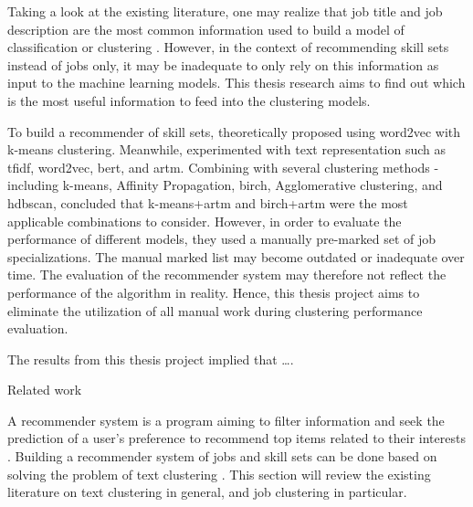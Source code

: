 \documentclass[a4paper,man,floatsintext,natbib,noextraspace]{apa6}
\makeatletter
\renewcommand{\section}{\@startsection {section}{1}
  {\z@}
  {\b@level@one@skip}
  {\e@level@one@skip}
  {\centering\normalfont\bfseries}}
\makeatother
\begin{document}
Taking a look at the existing literature, one may realize that job title and job description are the most common information used to build a model of classification \citep{boselliClassifyingOnlineJob2018} or clustering \citep{djumalievaClassifyingOccupationsAccording2018, mhamdiJobRecommendationBased2020}. However, in the context of recommending skill sets instead of jobs only, it may be inadequate to only rely on this information as input to the machine learning models. This thesis research aims to find out which is the most useful information to feed into the clustering models.

To build a recommender of skill sets, \cite{mhamdiJobRecommendationBased2020} theoretically proposed using word2vec with k-means clustering. Meanwhile, \cite{vinelExperimentalComparisonUnsupervised2019} experimented with text representation such as \gls{tfidf}, word2vec, \gls{bert}, and \gls{artm}. Combining with several clustering methods - including k-means, Affinity Propagation, \gls{birch}, Agglomerative clustering, and \gls{hdbscan}, \cite{vinelExperimentalComparisonUnsupervised2019} concluded that k-means+\gls{artm} and \gls{birch}+\gls{artm} were the most applicable combinations to consider. However, in order to evaluate the performance of different models, they used a manually pre-marked set of job specializations. The manual marked list may become outdated or inadequate over time. The evaluation of the recommender system may therefore not reflect the performance of the algorithm in reality. Hence, this thesis project aims to eliminate the utilization of all manual work during clustering performance evaluation.

The results from this thesis project implied that ….

\section{Related work}

A recommender system is a program aiming to filter information and seek the prediction of a user’s preference to recommend top items related to their interests \citep{luRecommenderSystemApplication2015}. Building a recommender system of jobs and skill sets can be done based on solving the problem of text clustering \citep{luRecommenderSystemApplication2015}. This section will review the existing literature on text clustering in general, and job clustering in particular.
\end{document}
